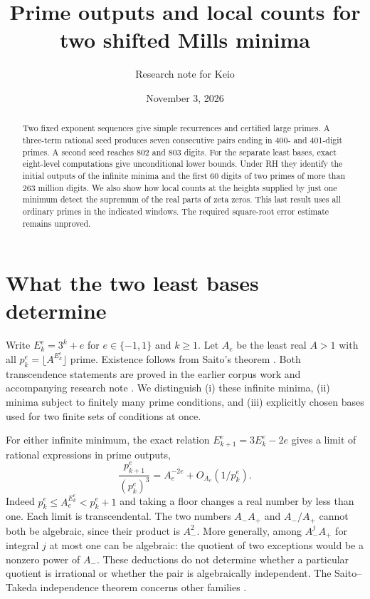 \documentclass[11pt]{article}
\title{Prime outputs and local counts for two shifted Mills minima}
\author{Research note for Keio}\date{November 3, 2026}
\newcommand{\fl}[1]{\lfloor #1\rfloor}
\begin{document}
\maketitle
\begin{abstract}
Two fixed exponent sequences give simple recurrences and certified large primes. A three-term rational seed produces seven consecutive pairs ending in 400- and 401-digit primes. A second seed reaches 802 and 803 digits. For the separate least bases, exact eight-level computations give unconditional lower bounds. Under RH they identify the initial outputs of the infinite minima and the first 60 digits of two primes of more than 263 million digits. We also show how local counts at the heights supplied by just one minimum detect the supremum of the real parts of zeta zeros. This last result uses all ordinary primes in the indicated windows. The required square-root error estimate remains unproved.
\end{abstract}

\section{What the two least bases determine}
Write $E_k^e=3^k+e$ for $e\in\{-1,1\}$ and $k\ge1$. Let $A_e$ be the least real $A>1$ with all $p_k^e=\fl{A^{E_k^e}}$ prime. Existence follows from Saito's theorem \cite{saito}. Both transcendence statements are proved in the earlier corpus work and accompanying research note \cite{prior}. We distinguish (i) these infinite minima, (ii) minima subject to finitely many prime conditions, and (iii) explicitly chosen bases used for two finite sets of conditions at once.

For either infinite minimum, the exact relation $E_{k+1}^e=3E_k^e-2e$ gives a limit of rational expressions in prime outputs,
\[
 \frac{p_{k+1}^e}{(p_k^e)^3}=A_e^{-2e}+O_{A_e}(1/p_k^e).
\]
Indeed $p_k^e\le A_e^{E_k^e}<p_k^e+1$ and taking a floor changes a real number by less than one. Each limit is transcendental. The two numbers $A_-A_+$ and $A_-/A_+$ cannot both be algebraic, since their product is $A_-^2$. More generally, among $A_-^jA_+$ for integral $j$ at most one can be algebraic: the quotient of two exceptions would be a nonzero power of $A_-$. These deductions do not determine whether a particular quotient is irrational or whether the pair is algebraically independent. The Saito--Takeda independence theorem concerns other families \cite{st}.
\end{document}
